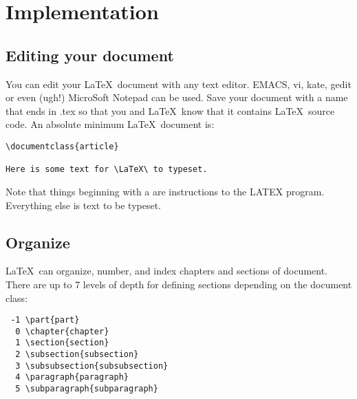 \chapter{Implementation}

\section{Editing your document}

You can edit your \LaTeX \ document with any text editor. EMACS, vi, kate, gedit or even (ugh!) MicroSoft Notepad can be used. Save your document with a name that ends in .tex so that you and \LaTeX \ know that it contains \LaTeX \ source code. An absolute minimum \LaTeX \ document is:

\begin{lstlisting}
\documentclass{article}
 
Here is some text for \LaTeX\ to typeset. 

\end{lstlisting}

Note that things beginning with a are instructions to the LATEX program. Everything else is text to be typeset. 

\section{Organize}

\LaTeX \ can organize, number, and index chapters and sections of document. There are up to 7 levels of depth for defining sections depending on the document class:
\begin{lstlisting}
 -1 \part{part}
  0 \chapter{chapter}
  1 \section{section}
  2 \subsection{subsection}
  3 \subsubsection{subsubsection}
  4 \paragraph{paragraph}
  5 \subparagraph{subparagraph}
\end{lstlisting}

